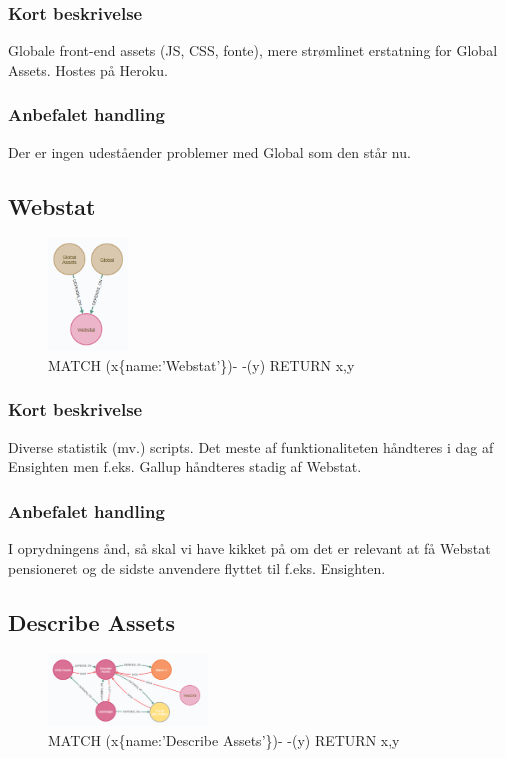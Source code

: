 \documentclass{article}
\begin{document}
\subsubsection{Kort beskrivelse}
Globale front-end assets (JS, CSS, fonte), mere strømlinet erstatning for Global Assets. Hostes på Heroku.
\subsubsection{Anbefalet handling}
Der er ingen udeståender problemer med Global som den står nu.


\subsection{Webstat}
\begin{figure}[h]
\includegraphics[width=60pt]{Webstat.PNG}
\caption{MATCH (x\{name:'Webstat'\})- -(y) RETURN x,y}
\end{figure}
\subsubsection{Kort beskrivelse}
Diverse statistik (mv.) scripts. Det meste af funktionaliteten håndteres i dag af Ensighten men f.eks. Gallup håndteres stadig af Webstat.
\subsubsection{Anbefalet handling}
I oprydningens ånd, så skal vi have kikket på om det er relevant at få Webstat pensioneret og de sidste anvendere flyttet til f.eks. Ensighten.


\subsection{Describe Assets}
\begin{figure}[h]
\includegraphics[width=120pt]{DescribeAssets.PNG}
\caption{MATCH (x\{name:'Describe Assets'\})- -(y) RETURN x,y}
\end{figure}
\end{document}
